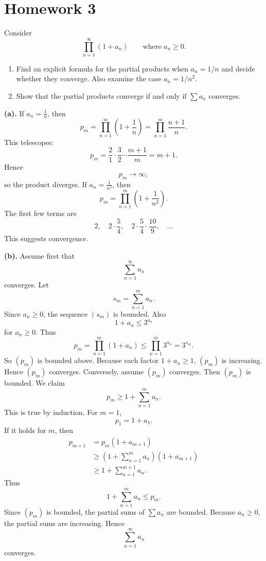 
\section{Homework 3}

\begin{problem}{
    Consider
    \[
        \prod_{n=1}^\infty(1+a_n)
        \qquad\text{where } a_n\geq0.
    \]
    \begin{enumerate}[label={(\alph*)}]
\item Find an explicit formula for the partial products when $a_n=1/n$ and decide whether they converge.
Also examine the case $a_n=1/n^2$.
\item Show that the partial products converge if and only if $\sum a_n$ converges.
    \end{enumerate}
}
    \textbf{(a).}
    If $a_n=\frac1n$, then
    \[
        p_m=\prod_{n=1}^m\left(1+\frac1n\right)
        =\prod_{n=1}^m \frac{n+1}{n}.
    \]
    This telescopes:
    \[
        p_m=\frac21\cdot\frac32\cdots\frac{m+1}{m}=m+1.
    \]
    Hence
    \[
        p_m\to\infty,
    \]
    so the product diverges.
    If $a_n=\frac1{n^2}$, then
    \[
        p_m=\prod_{n=1}^m\left(1+\frac1{n^2}\right).
    \]
    The first few terms are
    \[
        2,\quad 2\cdot\frac54,\quad 2\cdot\frac54\cdot\frac{10}{9},\quad \ldots
    \]
    This suggests convergence.

    \textbf{(b).}
    Assume first that
    \[
        \sum_{n=1}^\infty a_n
    \]
    converges.
    Let
    \[
        s_m=\sum_{n=1}^m a_n.
    \]
    Since $a_n\geq0$, the sequence $(s_m)$ is bounded.
    Also
    \[
        1+a_n\leq 3^{a_n}
    \]
    for $a_n\geq0$.
    Thus
    \[
        p_m=\prod_{n=1}^m(1+a_n)\leq \prod_{n=1}^m 3^{a_n}=3^{s_m}.
    \]
    So $(p_m)$ is bounded above.
    Because each factor $1+a_n\geq1$, $(p_m)$ is increasing.
    Hence $(p_m)$ converges.
    Conversely, assume $(p_m)$ converges.
    Then $(p_m)$ is bounded.
    We claim
    \[
        p_m\geq 1+\sum_{n=1}^m a_n.
    \]
    This is true by induction.
    For $m=1$,
    \[
        p_1=1+a_1.
    \]
    If it holds for $m$, then
    \begin{align*}
        p_{m+1}
        &=p_m(1+a_{m+1})\\
        &\geq \left(1+\sum_{n=1}^m a_n\right)(1+a_{m+1})\\
        &\geq 1+\sum_{n=1}^{m+1}a_n.
    \end{align*}
    Thus
    \[
        1+\sum_{n=1}^m a_n\leq p_m.
    \]
    Since $(p_m)$ is bounded, the partial sums of $\sum a_n$ are bounded.
    Because $a_n\geq0$, the partial sums are increasing.
    Hence
    \[
        \sum_{n=1}^\infty a_n
    \]
    converges.
\end{problem}

